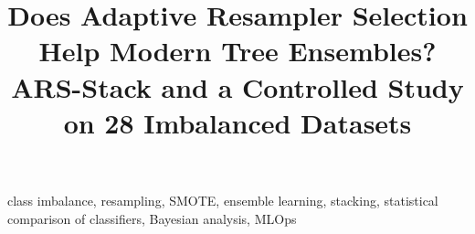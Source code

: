 \documentclass[conference]{IEEEtran}
\begin{document}
\title{Does Adaptive Resampler Selection Help Modern Tree Ensembles? ARS-Stack and a Controlled Study on 28
Imbalanced Datasets}

\author{
\and
{}
}

\maketitle

\begin{abstract}

\end{abstract}

\begin{IEEEkeywords}
class imbalance, resampling, SMOTE, ensemble learning, stacking, statistical comparison of classifiers, Bayesian
analysis, MLOps
\end{IEEEkeywords}











\end{document}
